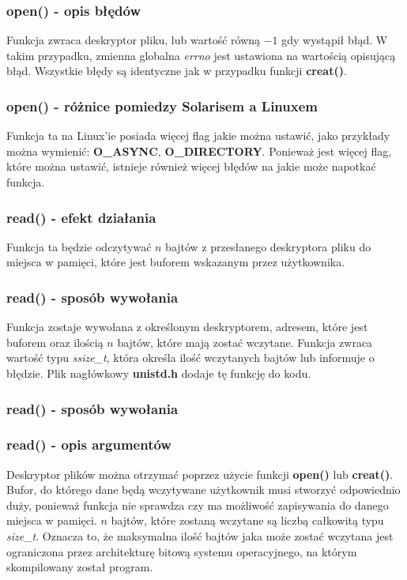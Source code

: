 \documentclass{beamer}
\begin{document}
\begin{frame}
	\frametitle{open() - opis błędów}
Funkcja zwraca deskryptor pliku, lub wartość równą $-1$ gdy wystąpił błąd.
W takim przypadku, zmienna globalna \textit{errno} jest ustawiona na wartością opisującą błąd.
Wszystkie błędy są identyczne jak w przypadku funkcji \textbf{creat()}.
\end{frame}

\begin{frame}
	\frametitle{open() - różnice pomiedzy Solarisem a Linuxem}
Funkcja ta na Linux'ie posiada więcej flag jakie można ustawić, jako przykłady można wymienić: \textbf{O\_ASYNC}, \textbf{O\_DIRECTORY}.
Ponieważ jest więcej flag, które można ustawić, istnieje również więcej błędów na jakie może napotkać funkcja. 
\end{frame}

\begin{frame}
	\frametitle{read() - efekt działania}
Funkcja ta będzie odczytywać $n$ bajtów z przesłanego deskryptora pliku do miejsca w pamięci,
które jest buforem wskazanym przez użytkownika.
\end{frame}

\begin{frame}
	\frametitle{read() - sposób wywołania}
Funkcja zostaje wywołana z określonym deskryptorem, adresem, które jest buforem oraz ilością $n$ bajtów, które mają zostać wczytane. Funkcja zwraca wartość typu \textit{ssize\_t}, która określa ilość wczytanych bajtów lub informuje o błędzie.
Plik nagłówkowy \textbf{unistd.h} dodaje tę funkcję do kodu.
\end{frame}

\begin{frame}
	\frametitle{read() - sposób wywołania}
	\lstread
\end{frame}

\begin{frame}
	\frametitle{read() - opis argumentów}
Deskryptor plików można otrzymać poprzez użycie funkcji \textbf{open()} lub \textbf{creat()}.
Bufor, do którego dane będą wczytywane użytkownik musi stworzyć odpowiednio duży, ponieważ funkcja nie sprawdza czy ma możliwość zapisywania do danego miejsca w pamięci.
$n$ bajtów, które zostaną wczytane są liczbą całkowitą typu \textit{size\_t}.
Oznacza to, że maksymalna ilość bajtów jaka może zostać wczytana jest ograniczona przez architekturę bitową systemu operacyjnego, na którym skompilowany został program.
\end{frame}
\end{document}
